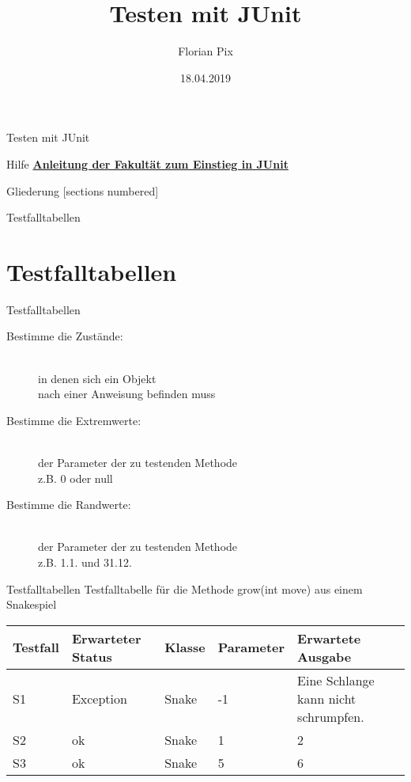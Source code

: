 \documentclass[10pt]{beamer}
\author{Florian Pix}
\institute{SWT Übung SoSe19}
\title{Testen mit JUnit}
\date{18.04.2019}
\begin{document}
\begin{frame}{Testen mit JUnit}
    \titlepage
\end{frame}

\begin{frame}{Hilfe}
    \textcolor{mymauve}{\textbf{\href{https://st.inf.tu-dresden.de/files/teaching/ss19/st/Arbeiten mit JUnit 3.8.pdf}{Anleitung der Fakultät zum Einstieg in JUnit}}}
\end{frame}

\begin{frame}{Gliederung}
    [sections numbered]
    \tableofcontents
\end{frame}

\begin{frame}[fragile]{Testfalltabellen}
    \section{Testfalltabellen}
\end{frame}

\begin{frame}[fragile]{Testfalltabellen}
\begin{description}
\item[Bestimme die Zustände:]\hfill \\
in denen sich ein Objekt\\ 
nach einer Anweisung befinden muss
\item[Bestimme die Extremwerte:]\hfill \\
der Parameter der zu testenden Methode \\
z.B. 0 oder null
\item[Bestimme die Randwerte:]\hfill \\
der Parameter der zu testenden Methode \\
z.B. 1.1. und 31.12.
\end{description}
\end{frame}

\begin{frame}[fragile]{Testfalltabellen}
Testfalltabelle für die Methode grow(int move) aus einem Snakespiel

\begin{tabularx}{11cm}{|X|X|X|X|X|}
\hline
Testfall & Erwarteter Status & Klasse & Parameter & Erwartete Ausgabe\\
\hline
S1 & Exception & Snake & -1 & Eine Schlange kann nicht schrumpfen.\\
\hline
S2 & ok & Snake & 1 & 2\\
\hline
S3 & ok & Snake & 5 & 6\\
\hline
\end{tabularx}
\end{frame}
\end{document}
